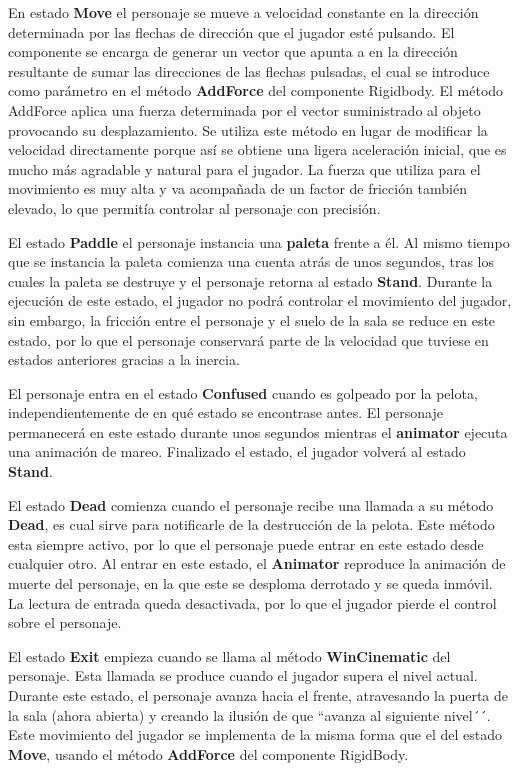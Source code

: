 En estado \textbf{Move} el personaje se mueve a velocidad constante en la dirección determinada por las flechas de dirección que el jugador esté pulsando. El componente se encarga de generar un vector que apunta a en la dirección resultante de sumar las direcciones de las flechas pulsadas, el cual se introduce como parámetro en el método \textbf{AddForce} del componente Rigidbody. El método AddForce aplica una fuerza determinada por el vector suministrado al objeto provocando su desplazamiento. Se utiliza este método en lugar de modificar la velocidad directamente porque así se obtiene una ligera aceleración inicial, que es mucho más agradable y natural para el jugador. La fuerza que utiliza para el movimiento es muy alta y va acompañada de un factor de fricción también elevado, lo que permitía controlar al personaje con precisión.

El estado \textbf{Paddle} el personaje instancia una \textbf{paleta} frente a él. Al mismo tiempo que se instancia la paleta comienza una cuenta atrás de unos segundos, tras los cuales la paleta se destruye y el personaje retorna al estado \textbf{Stand}. Durante la ejecución de este estado, el jugador no podrá controlar el movimiento del jugador, sin embargo, la fricción entre el personaje y el suelo de la sala se reduce en este estado, por lo que el personaje conservará parte de la velocidad que tuviese en estados anteriores gracias a la inercia.

El personaje entra en el estado \textbf{Confused} cuando es golpeado por la pelota, independientemente de en qué estado se encontrase antes. El personaje permanecerá en este estado durante unos segundos mientras el \textbf{animator} ejecuta una animación de mareo. Finalizado el estado, el jugador volverá al estado \textbf{Stand}.

El estado \textbf{Dead} comienza cuando el personaje recibe una llamada a su método \textbf{Dead}, es cual sirve para notificarle de la destrucción de la pelota. Este método esta siempre activo, por lo que el personaje puede entrar en este estado desde cualquier otro. Al entrar en este estado, el \textbf{Animator} reproduce la animación de muerte del personaje, en la que este se desploma derrotado y se queda inmóvil. La lectura de entrada queda desactivada, por lo que el jugador pierde el control sobre el personaje.

El estado \textbf{Exit} empieza cuando se llama al método \textbf{WinCinematic} del personaje. Esta llamada se produce cuando el jugador supera el nivel actual. Durante este estado, el personaje avanza hacia el frente, atravesando la puerta de la sala (ahora abierta) y creando la ilusión de que ``avanza al siguiente nivel´´. Este movimiento del jugador se implementa de la misma forma que el del estado \textbf{Move}, usando el método \textbf{AddForce} del componente RigidBody.

